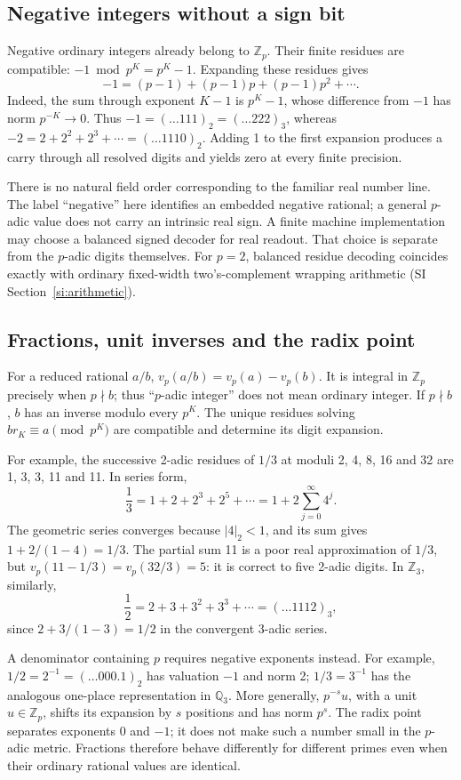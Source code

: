 \documentclass[11pt]{article}
\newcommand{\Q}{\mathbb{Q}}
\newcommand{\Z}{\mathbb{Z}}
\newcommand{\vp}{v_p}
\newcommand{\Zp}{\mathbb{Z}_p}
\begin{document}
\subsection{Negative integers without a sign bit}

Negative ordinary integers already belong to \(\Zp\). Their finite residues
are compatible: \(-1\bmod p^K=p^K-1\). Expanding these residues gives
\[
 -1=(p-1)+(p-1)p+(p-1)p^2+\cdots.
\]
Indeed, the sum through exponent \(K-1\) is \(p^K-1\), whose difference
from \(-1\) has norm \(p^{-K}\to0\). Thus
\(-1=(\ldots111)_2=(\ldots222)_3\), whereas
\(-2=2+2^2+2^3+\cdots=(\ldots1110)_2\).
Adding 1 to the first expansion produces a carry through all resolved digits
and yields zero at every finite precision.

There is no natural field order corresponding to the familiar real number
line. The label ``negative'' here identifies an embedded negative rational;
a general \(p\)-adic value does not carry an intrinsic real sign. A finite
machine implementation may choose a balanced signed decoder for real
readout. That choice is separate from the \(p\)-adic digits themselves.
For \(p=2\), balanced residue decoding coincides exactly with ordinary
fixed-width two's-complement wrapping arithmetic (SI Section~\ref{si:arithmetic}).

\subsection{Fractions, unit inverses and the radix point}

For a reduced rational \(a/b\),
\(\vp(a/b)=\vp(a)-\vp(b)\). It is integral in \(\Zp\) precisely when
\(p\nmid b\); thus ``\(p\)-adic integer'' does not mean ordinary integer.
If \(p\nmid b\), \(b\) has an inverse modulo every \(p^K\). The unique
residues solving \(br_K\equiv a\pmod{p^K}\) are compatible and determine
its digit expansion.

For example, the successive 2-adic residues of \(1/3\) at moduli
2, 4, 8, 16 and 32 are 1, 3, 3, 11 and 11. In series form,
\[
 \frac13=1+2+2^3+2^5+\cdots
       =1+2\sum_{j=0}^{\infty}4^j.
\]
The geometric series converges because \(|4|_2<1\), and its sum gives
\(1+2/(1-4)=1/3\). The partial sum 11 is a poor real approximation of
\(1/3\), but \(\vp(11-1/3)=\vp(32/3)=5\): it is correct to five
2-adic digits. In \(\Z_3\), similarly,
\[
 \frac12=2+3+3^2+3^3+\cdots=(\ldots1112)_3,
\]
since \(2+3/(1-3)=1/2\) in the convergent 3-adic series.

A denominator containing \(p\) requires negative exponents instead.
For example, \(1/2=2^{-1}=(\ldots000.1)_2\) has valuation \(-1\)
and norm 2; \(1/3=3^{-1}\) has the analogous one-place representation
in \(\Q_3\). More generally, \(p^{-s}u\), with a unit \(u\in\Zp\),
shifts its expansion by \(s\) positions and has norm \(p^s\).
The radix point separates exponents 0 and \(-1\); it does not make such a
number small in the \(p\)-adic metric. Fractions therefore behave differently
for different primes even when their ordinary rational values are identical.
\end{document}
